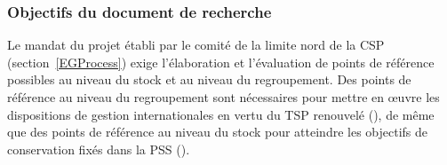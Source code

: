 \documentclass[french,11pt]{book}
\begin{document}
\subsubsection{Objectifs du document de recherche}\label{PaperObj}

Le mandat du projet établi par le comité de la limite nord de la CSP (section~\ref{EGProcess}) exige l'élaboration et l'évaluation de points de référence possibles au niveau du stock et au niveau du regroupement. Des points de référence au niveau du regroupement sont nécessaires pour mettre en œuvre les dispositions de gestion internationales en vertu du TSP renouvelé (), de même que des points de référence au niveau du stock pour atteindre les objectifs de conservation fixés dans la PSS ().
\end{document}
